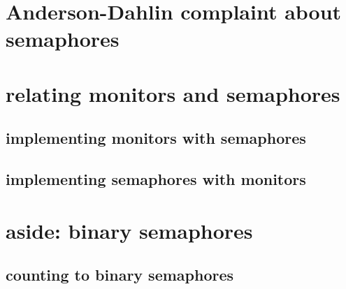 
\section{Anderson-Dahlin complaint about semaphores}


\section{relating monitors and semaphores}

\subsection{implementing monitors with semaphores}

 

\subsection{implementing semaphores with monitors}



\section{aside: binary semaphores}



\subsection{counting to binary semaphores}


